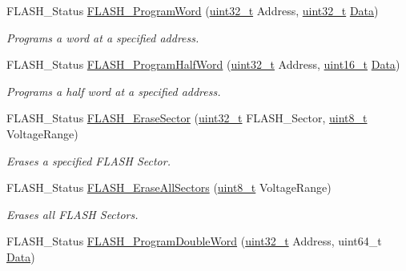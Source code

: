 \begin{DoxyCompactItemize}
F\-L\-A\-S\-H\-\_\-\-Status \hyperlink{group___f_l_a_s_h___group2_gaac9a2f400b92537bd42a6bd7cc237b11}{F\-L\-A\-S\-H\-\_\-\-Program\-Word} (\hyperlink{stdint_8h_a435d1572bf3f880d55459d9805097f62}{uint32\-\_\-t} Address, \hyperlink{stdint_8h_a435d1572bf3f880d55459d9805097f62}{uint32\-\_\-t} \hyperlink{group___copter_control_b_l_ga6f3335509cc4943e20df66f72483910c}{Data})
\begin{DoxyCompactList}\small\item\em Programs a word at a specified address. \end{DoxyCompactList}\item 
F\-L\-A\-S\-H\-\_\-\-Status \hyperlink{group___f_l_a_s_h___group2_ga5c1336f667950a8765887228f1d0d501}{F\-L\-A\-S\-H\-\_\-\-Program\-Half\-Word} (\hyperlink{stdint_8h_a435d1572bf3f880d55459d9805097f62}{uint32\-\_\-t} Address, \hyperlink{stdint_8h_a273cf69d639a59973b6019625df33e30}{uint16\-\_\-t} \hyperlink{group___copter_control_b_l_ga6f3335509cc4943e20df66f72483910c}{Data})
\begin{DoxyCompactList}\small\item\em Programs a half word at a specified address. \end{DoxyCompactList}\item 
F\-L\-A\-S\-H\-\_\-\-Status \hyperlink{group___f_l_a_s_h___group2_ga48f408290b32a3aebbcad83a00fc447c}{F\-L\-A\-S\-H\-\_\-\-Erase\-Sector} (\hyperlink{stdint_8h_a435d1572bf3f880d55459d9805097f62}{uint32\-\_\-t} F\-L\-A\-S\-H\-\_\-\-Sector, \hyperlink{stdint_8h_aba7bc1797add20fe3efdf37ced1182c5}{uint8\-\_\-t} Voltage\-Range)
\begin{DoxyCompactList}\small\item\em Erases a specified F\-L\-A\-S\-H Sector. \end{DoxyCompactList}\item 
F\-L\-A\-S\-H\-\_\-\-Status \hyperlink{group___f_l_a_s_h___group2_ga2aee006e5f4db4280bdedd401dfa50f9}{F\-L\-A\-S\-H\-\_\-\-Erase\-All\-Sectors} (\hyperlink{stdint_8h_aba7bc1797add20fe3efdf37ced1182c5}{uint8\-\_\-t} Voltage\-Range)
\begin{DoxyCompactList}\small\item\em Erases all F\-L\-A\-S\-H Sectors. \end{DoxyCompactList}\item 
F\-L\-A\-S\-H\-\_\-\-Status \hyperlink{group___f_l_a_s_h___group2_gab84b52121e58d0dbc8ff2a92145d20f2}{F\-L\-A\-S\-H\-\_\-\-Program\-Double\-Word} (\hyperlink{stdint_8h_a435d1572bf3f880d55459d9805097f62}{uint32\-\_\-t} Address, uint64\-\_\-t \hyperlink{group___copter_control_b_l_ga6f3335509cc4943e20df66f72483910c}{Data})

\end{DoxyCompactItemize}

